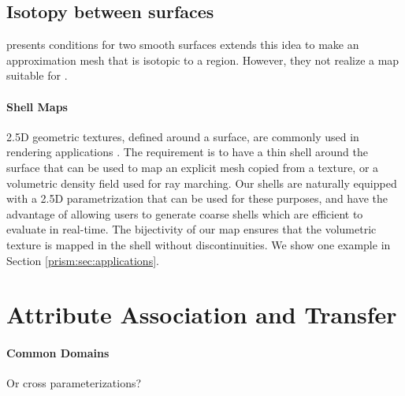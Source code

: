 \subsection{Isotopy between surfaces}

 presents conditions for two  smooth surfaces  \cite{mandad2015isotopic} extends this idea to make an approximation mesh that is isotopic to a region. However, they  not realize a map suitable for .


\paragraph{Shell Maps}
2.5D geometric textures, defined around a surface, are commonly used in rendering applications \cite{wang2003view,wang2004generalized,porumbescu2005shell,peng2004interactive,lengyel2001real,chen2004shell,huang2007gradient,jin2019shell}. The requirement is to have a thin shell around the surface that can be used to map an explicit mesh copied from a texture, or a volumetric density field used for ray marching. Our shells are naturally equipped with a 2.5D parametrization that can be used for these purposes, and have the advantage of allowing users to  generate coarse shells which are efficient to evaluate in real-time. The bijectivity of our map ensures that the  volumetric texture is mapped in the shell without discontinuities. We show one example in Section \ref{prism:sec:applications}.

\section{Attribute Association and Transfer}
\paragraph{Common Domains}
Or cross parameterizations?

